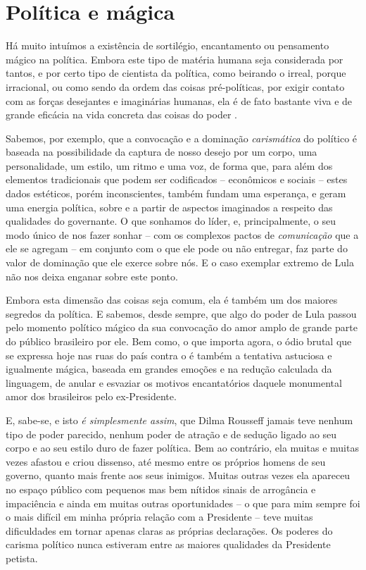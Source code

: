   \section{Política e mágica}\label{poluxedtica-e-muxe1gica}

Há muito intuímos a existência de sortilégio, encantamento ou pensamento
mágico na política. Embora este tipo de matéria humana seja considerada
por tantos, e por certo tipo de cientista da política, como beirando o
irreal, porque irracional, ou como sendo da ordem das coisas
pré-políticas, por exigir contato com as forças desejantes e imaginárias
humanas, ela é de fato bastante viva e de grande eficácia na vida
concreta das coisas do poder .

Sabemos, por exemplo, que a convocação e a dominação \emph{carismática}
do político é baseada na possibilidade da captura de nosso desejo por um
corpo, uma personalidade, um estilo, um ritmo e uma voz, de forma que,
para além dos elementos tradicionais que podem ser codificados --
econômicos e sociais -- estes dados estéticos, porém inconscientes,
também fundam uma esperança, e geram uma energia política, sobre e a
partir de aspectos imaginados a respeito das qualidades do governante. O
que sonhamos do líder, e, principalmente, o seu modo único de nos fazer
sonhar -- com os complexos pactos de \emph{comunicação} que a ele se
agregam -- em conjunto com o que ele pode ou não entregar, faz parte do
valor de dominação que ele exerce sobre nós. E o caso exemplar extremo
de Lula não nos deixa enganar sobre este ponto.

Embora esta dimensão das coisas seja comum, ela é também um dos maiores
segredos da política. E sabemos, desde sempre, que algo do poder de Lula
passou pelo momento político mágico da sua convocação do amor amplo de
grande parte do público brasileiro por ele. Bem como, o que importa
agora, o ódio brutal que se expressa hoje nas ruas do país contra o  é
também a tentativa astuciosa e igualmente mágica, baseada em grandes
emoções e na redução calculada da linguagem, de anular e esvaziar os
motivos encantatórios daquele monumental amor dos brasileiros pelo
ex-Presidente.

E, sabe-se, e isto \emph{é simplesmente assim}, que Dilma Rousseff
jamais teve nenhum tipo de poder parecido, nenhum poder de atração e de
sedução ligado ao seu corpo e ao seu estilo duro de fazer política. Bem
ao contrário, ela muitas e muitas vezes afastou e criou dissenso, até
mesmo entre os próprios homens de seu governo, quanto mais frente aos
seus inimigos. Muitas outras vezes ela apareceu no espaço público com
pequenos mas bem nítidos sinais de arrogância e impaciência e ainda em
muitas outras oportunidades -- o que para mim sempre foi o mais difícil
em minha própria relação com a Presidente -- teve muitas dificuldades em
tornar apenas claras as próprias declarações. Os poderes do carisma
político nunca estiveram entre as maiores qualidades da Presidente
petista.


